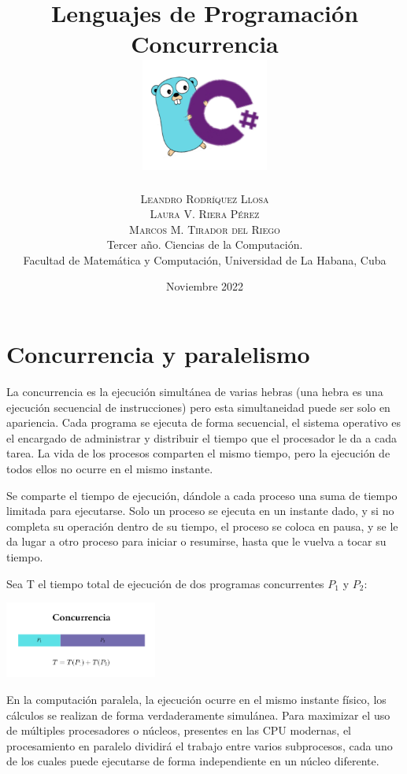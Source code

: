 \documentclass[10pt]{article} %
\title{\normalsize{Lenguajes de Programaci\'on}\\
\Huge\bfseries Concurrencia\\
\includegraphics[height=5em]{go_cs_logo.png}} %
\author{%
\normalsize\textsc{Leandro Rodr\'iquez Llosa}\\
\normalsize\textsc{Laura V. Riera P\'erez}\\ 
\normalsize\textsc{Marcos M. Tirador del Riego} \\[2ex]
\small Tercer a\~no. Ciencias de la Computaci\'on. \\ %
\small Facultad de Matem\'atica y Computaci\'on, Universidad de La Habana, Cuba \\ %
}
\date{\footnotesize Noviembre 2022 } %
\begin{document}
\maketitle


\section{Concurrencia y paralelismo}

La concurrencia es la ejecuci\'on simult\'anea de varias hebras (una hebra es una ejecuci\'on secuencial de instrucciones) pero esta simultaneidad puede ser solo en apariencia. Cada programa se ejecuta de forma secuencial, el sistema operativo es el encargado de administrar y distribuir el tiempo que el procesador le da a cada tarea. La vida de los procesos comparten el mismo tiempo, pero la ejecución de todos ellos no ocurre en el mismo instante. 

Se comparte el tiempo de ejecución, dándole a cada proceso una suma de tiempo limitada para ejecutarse. Solo un proceso se ejecuta en un instante dado, y si no completa su operación dentro de su tiempo, el proceso se coloca en pausa, y se le da lugar a otro proceso para iniciar o resumirse, hasta que le vuelva a tocar su tiempo.

Sea T el tiempo total de ejecuci\'on de dos programas concurrentes $ P_{1} $ y $ P_{2} $:

\begin{center}
	\includegraphics[width=5cm]{concurrencia.png}
\end{center}

En la computación paralela, la ejecución ocurre en el mismo instante físico, los c\'alculos se realizan de forma verdaderamente simul\'anea. Para maximizar el uso de múltiples procesadores o n\'ucleos, presentes en las CPU modernas, el procesamiento en paralelo dividirá el trabajo entre varios subprocesos, cada uno de los cuales puede ejecutarse de forma independiente en un núcleo diferente.
\end{document}

